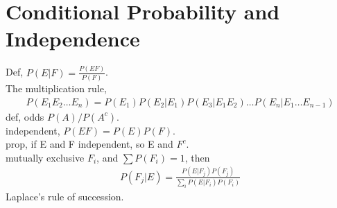 \documentclass[paper=a4, fontsize=11pt]{scrartcl} %
\numberwithin{equation}{section} %
\numberwithin{figure}{section} %
\numberwithin{table}{section} %
\begin{document}
\section{Conditional Probability and Independence}
Def, $P(E|F) = \frac{P(EF)}{P(F)}$.\\
The multiplication rule,
\begin{align}
	P(E_1E_2\dots E_n) = P(E_1)P(E_2|E_1)P(E_3|E_1E_2)\dots P(E_n|E_1\dots E_{n-1})
\end{align}
def, odds $P(A)/P(A^c)$.\\
independent, $P(EF)=P(E)P(F)$.\\
prop, if E and F independent, so E and $F^c$.\\
mutually exclusive $F_i$, and $\sum P(F_i)=1$, then
\begin{align}
P(F_j|E) = \frac{P(E|F_j)P(F_j)} {\sum_i P(E|F_i)P(F_i)}
\end{align}
Laplace's rule of succession.\\
\end{document}
